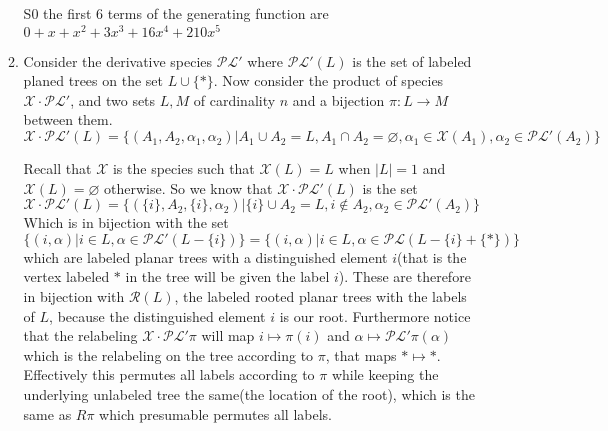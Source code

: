 \documentclass[12pt]{amsart}
\theoremstyle{definition}
\newcommand{\ra}{\rightarrow}
\let\emptyset\varnothing
\begin{document}
\begin{itemize}
\begin{enumerate}[label=(\alph*)]
    S0 the first $6$ terms of the generating function are $0+x+x^2+3x^3+16x^4+210x^5$
    \item %
    Consider the derivative species $\mathcal{PL}'$ where $\mathcal{PL}'(L)$ is the set of labeled planed trees on the set $L\cup \{*\}$. Now consider the product of species $\mathcal{X}\cdot\mathcal{PL}'$, and two sets $L,M$ of cardinality $n$ and a bijection $\pi:L\ra M$ between them. 
    \begin{equation*}
        \mathcal{X}\cdot\mathcal{PL}'(L)=
        \{(A_1,A_2,\alpha_1,\alpha_2)| A_1\cup A_2=L, A_1\cap A_2=\emptyset,\alpha_1\in \mathcal{X}(A_1), \alpha_2\in \mathcal{PL}'(A_2)\}
    \end{equation*}
    
    Recall that $\mathcal{X}$ is the species such that $\mathcal{X}(L)=L$ when $|L|=1$ and $\mathcal{X}(L)=\emptyset$ otherwise. So we know that $\mathcal{X}\cdot\mathcal{PL}'(L)$ is the set 
    $$\mathcal{X}\cdot\mathcal{PL}'(L)=\{(\{i\},A_2,\{i\},\alpha_2)| \{i\}\cup A_2=L, i\not\in A_2, \alpha_2\in \mathcal{PL}'(A_2)\}$$
    Which is in bijection with the set $\{(i, \alpha)|i\in L, \alpha\in \mathcal{PL}'(L-\{i\})\}=\{(i, \alpha)|i\in L, \alpha\in\mathcal{PL}(L-\{i\}+\{*\})\}$ which are labeled planar trees with a distinguished element $i$(that is the vertex labeled $*$ in the tree will be given the label $i$). These are therefore in bijection with $\mathcal{R}(L)$, the labeled rooted planar trees with the labels of $L$, because the distinguished element $i$ is our root. Furthermore notice that the relabeling $\mathcal{X}\cdot\mathcal{PL}'\pi$ will map $i\mapsto \pi(i)$ and $\alpha\mapsto \mathcal{PL}'\pi(\alpha)$ which is the relabeling on the tree according to $\pi$, that maps $*\mapsto *$. Effectively this permutes all labels according to $\pi$ while keeping the underlying unlabeled tree the same(the location of the root), which is the same as $R\pi$ which presumable permutes all labels.\\ %
    


\end{enumerate}
\end{itemize}
\end{document}
